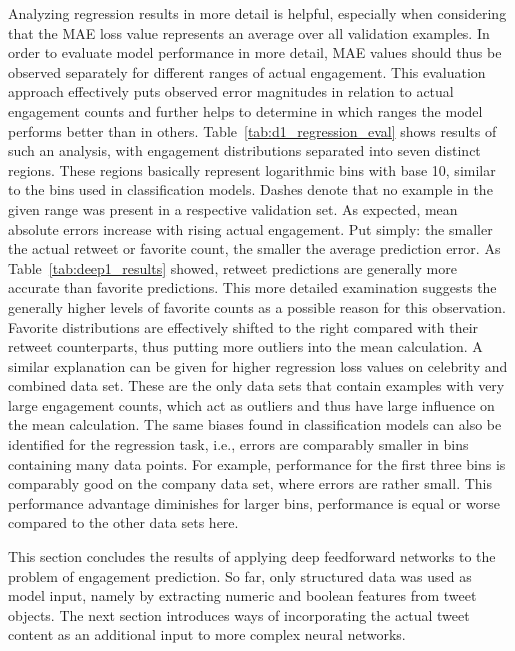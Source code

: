 Analyzing regression results in more detail is helpful, especially when considering
that the MAE loss value represents an average over all validation examples.
In order to evaluate model performance in more detail, MAE values should thus be
observed separately for different ranges of actual engagement.
This evaluation approach effectively puts observed error magnitudes in relation
to actual engagement counts and further helps to determine in which ranges 
the model performs better than in others.
Table~\ref{tab:d1_regression_eval} shows results of such an analysis, with
engagement distributions separated into seven distinct regions.
These regions basically represent logarithmic bins with base 10, similar to
the bins used in classification models.
Dashes denote that no example in the given range was present in a respective
validation set.
As expected, mean absolute errors increase with rising actual engagement.
Put simply: the smaller the actual retweet or favorite count, the smaller the
average prediction error.
As Table~\ref{tab:deep1_results} showed, retweet predictions are generally more
accurate than favorite predictions.
This more detailed examination suggests the generally higher levels of favorite
counts as a possible reason for this observation.
Favorite distributions are effectively shifted to the right compared with their
retweet counterparts, thus putting more outliers into the mean calculation.
A similar explanation can be given for higher regression loss values on
celebrity and combined data set.
These are the only data sets that contain examples with very large engagement
counts, which act as outliers and thus have large influence on the mean
calculation.
The same biases found in classification models can also be identified for the
regression task, i.e., errors are comparably smaller in bins containing many data points.
For example, performance for the first three bins is comparably good on the company data
set, where errors are rather small.
This performance advantage diminishes for larger bins, performance is equal or
worse compared to the other data sets here.

This section concludes the results of applying deep feedforward networks to
the problem of engagement prediction. 
So far, only structured data was used as model input, namely by extracting
numeric and boolean features from tweet objects.
The next section introduces ways of incorporating the actual tweet content as
an additional input to more complex neural networks.


